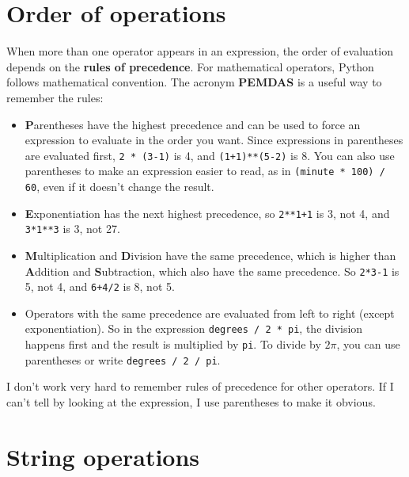 \documentclass[10pt]{book}
\begin{document}
\section{Order of operations}

When more than one operator appears in an expression, the order of
evaluation depends on the {\bf rules of precedence}.  For
mathematical operators, Python follows mathematical convention.
The acronym {\bf PEMDAS} is a useful way to
remember the rules:

\begin{itemize}

\item {\bf P}arentheses have the highest precedence and can be used 
to force an expression to evaluate in the order you want. Since
expressions in parentheses are evaluated first, {\tt 2 * (3-1)} is 4,
and {\tt (1+1)**(5-2)} is 8. You can also use parentheses to make an
expression easier to read, as in {\tt (minute * 100) / 60}, even
if it doesn't change the result.

\item {\bf E}xponentiation has the next highest precedence, so
{\tt 2**1+1} is 3, not 4, and {\tt 3*1**3} is 3, not 27.

\item {\bf M}ultiplication and {\bf D}ivision have the same precedence,
which is higher than {\bf A}ddition and {\bf S}ubtraction, which also
have the same precedence.  So {\tt 2*3-1} is 5, not 4, and
{\tt 6+4/2} is 8, not 5.

\item Operators with the same precedence are evaluated from left to
  right (except exponentiation).  So in the expression {\tt degrees /
    2 * pi}, the division happens first and the result is multiplied
  by {\tt pi}.  To divide by $2 \pi$, you can use parentheses or write
  {\tt degrees / 2 / pi}.

\end{itemize}

I don't work very hard to remember rules of precedence for other
operators.  If I can't tell by looking at the expression, I use
parentheses to make it obvious.

\section{String operations}
\end{document}
